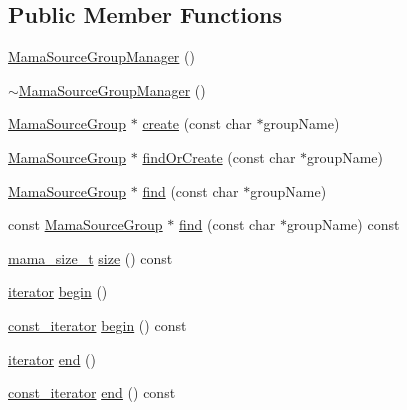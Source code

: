 \subsection*{Public Member Functions}
\begin{DoxyCompactItemize}
\item 
\hyperlink{classWombat_1_1MamaSourceGroupManager_a840c13d71d82d59de0b030f191fb87e4}{MamaSourceGroupManager} ()
\item 
\hyperlink{classWombat_1_1MamaSourceGroupManager_af0be50dfe7f6f7a81d1e98a0e8351d56}{$\sim$MamaSourceGroupManager} ()
\item 
\hyperlink{classWombat_1_1MamaSourceGroup}{MamaSourceGroup} $\ast$ \hyperlink{classWombat_1_1MamaSourceGroupManager_af20e29d1eb75c20be4ef85ad57400b09}{create} (const char $\ast$groupName)
\item 
\hyperlink{classWombat_1_1MamaSourceGroup}{MamaSourceGroup} $\ast$ \hyperlink{classWombat_1_1MamaSourceGroupManager_a418343b7d566032b737f3e88c5c4b848}{findOrCreate} (const char $\ast$groupName)
\item 
\hyperlink{classWombat_1_1MamaSourceGroup}{MamaSourceGroup} $\ast$ \hyperlink{classWombat_1_1MamaSourceGroupManager_a1fa1f259b6a9f4cc9ca29276f524f78b}{find} (const char $\ast$groupName)
\item 
const \hyperlink{classWombat_1_1MamaSourceGroup}{MamaSourceGroup} $\ast$ \hyperlink{classWombat_1_1MamaSourceGroupManager_a15d98b9adefe68162725d073cc8cb354}{find} (const char $\ast$groupName) const 
\item 
\hyperlink{classmama__size__t}{mama\_\-size\_\-t} \hyperlink{classWombat_1_1MamaSourceGroupManager_ad995a0fdf2e03a71f0d4f64fc5242000}{size} () const 
\item 
\hyperlink{classWombat_1_1MamaSourceGroupManager_1_1iterator}{iterator} \hyperlink{classWombat_1_1MamaSourceGroupManager_a8e20d2ed0e8252085e08ac5a5d24559c}{begin} ()
\item 
\hyperlink{classWombat_1_1MamaSourceGroupManager_1_1iterator}{const\_\-iterator} \hyperlink{classWombat_1_1MamaSourceGroupManager_a34e1f6f9da42091da592ac502758abde}{begin} () const 
\item 
\hyperlink{classWombat_1_1MamaSourceGroupManager_1_1iterator}{iterator} \hyperlink{classWombat_1_1MamaSourceGroupManager_aefd2adc5d7af7b5e95c023933925abf3}{end} ()
\item 
\hyperlink{classWombat_1_1MamaSourceGroupManager_1_1iterator}{const\_\-iterator} \hyperlink{classWombat_1_1MamaSourceGroupManager_a477ca664bcbb3e5ab3a56ac6dc39c01d}{end} () const 
\end{DoxyCompactItemize}


